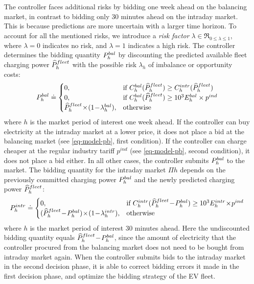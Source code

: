 \documentclass[a4paper, 12pt]{article}
\begin{document}
The controller faces additional risks by bidding one week ahead on the balancing
market, in contrast to bidding only 30 minutes ahead on the intraday market.
This is because predictions are more uncertain with a larger time horizon. To
account for all the mentioned risks, we introduce a \emph{risk factor} \(\lambda \in
\Re_{0 \leq \lambda \leq 1}\), where \(\lambda\!=\!0\) indicates no risk, and
\(\lambda\!=\!1\) indicates a high risk. The controller determines the bidding
quantity \(P^{bal}_{h}\) by discounting the predicted available fleet charging power
\(\widehat{P}^{fleet}_{h}\) with the possible risk \(\lambda_{h}\) of imbalance or opportunity
costs:
\begin{equation} \label{eq-model-pb}
  P^{bal}_{h} \doteq
  \begin{cases}
    0, & \text{if}\ C^{bal}_{h}(\widehat{P}^{fleet}_{h}) \geq C^{intr}_{h}(\widehat{P}^{fleet}_{h})\\
    0, & \text{if}\ C^{bal}_{h}(\widehat{P}^{fleet}_{h}) \geq 10^3E^{bal}_{h} \times p^{ind}\\
    \widehat{P}^{fleet}_{h}\!\times\!(1\!-\!\lambda^{bal}_{h}), & \text{otherwise}
  \end{cases}
\end{equation}
where \(h\) is the market period of interest one week ahead. If the controller can
buy electricity at the intraday market at a lower price, it does not place a bid
at the balancing market (see \eqref{eq-model-pb}, first condition). If the
controller can charge cheaper at the regular industry tariff \(p^{ind}\) (see
\eqref{eq-model-pb}, second condition), it does not place a bid either. In all
other cases, the controller submits \(P^{bal}_{h}\) to the market. The bidding quantity
for the intraday market \(\Pi{h}\) depends on the previously committed charging
power \(P^{bal}_{h}\) and the newly predicted charging power \(\widehat{P}^{fleet}_{h}\):
\begin{equation} \label{eq-model-pi}
  \Pi{h} \defeq
  \begin{cases}
    0, & \text{if}\ \Ci{h}(\fPhat{h}\!-\!\Pb{h}) \geq 10^3\Ei{h}\!\times\!p^{ind}\\
    (\fPhat{h}\!-\!\Pb{h})\!\times\!(1\!-\!\li{h}), & \text{otherwise}
  \end{cases}
\end{equation}
where \(h\) is the market period of interest 30 minutes ahead. Here the
undiscounted bidding quantity equals \(\widehat{P}^{fleet}_{h}\!-\!P^{bal}_{h}\), since the amount of
electricity that the controller procured from the balancing market does not need
to be bought from intraday market again. When the controller submits bids to the
intraday market in the second decision phase, it is able to correct bidding
errors it made in the first decision phase, and optimize the bidding strategy of
the EV fleet.
\end{document}
